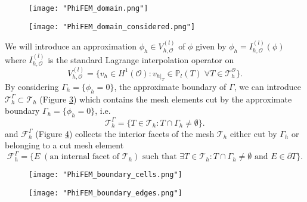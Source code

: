 \begin{minipage}{0.52\linewidth}
	\begin{figure}[H]
		\centering
		\texttt{[image: "PhiFEM\_domain.png"]}
		\label{space2}
	\end{figure}
\end{minipage} \;
\begin{minipage}{0.44\linewidth}
	\begin{figure}[H]
		\centering
		\texttt{[image: "PhiFEM\_domain\_considered.png"]}
		\label{space3}
	\end{figure}
\end{minipage}

We will introduce an approximation $\phi_h\in V_{h,\mathcal{O}}^{(l)}$ of $\phi$ given by $\phi_h=I_{h,\mathcal{O}}^{(l)}(\phi)$ where $I_{h,\mathcal{O}}^{(l)}$ is the standard Lagrange interpolation operator on
\begin{equation*}
	V_{h,\mathcal{O}}^{(l)}=\{v_h\in H^1(\mathcal{O}):v_{h|_T}\in\mathbb{P}_l(T) \;  \forall T\in\mathcal{T}_h^\mathcal{O}\}.
\end{equation*}
By considering $\Gamma_h=\{\phi_h=0\}$, the approximate boundary of $\Gamma$, we can introduce $\mathcal{T}_h^\Gamma\subset \mathcal{T}_h$ (Figure \ref{space4}) which contains the mesh elements cut by the
approximate boundary $\Gamma_h = \{\phi_h=0\}$, i.e. 
\begin{equation*}
	\mathcal{T}_h^\Gamma=\{T\in \mathcal{T}_h:T\cap\Gamma_h\ne\emptyset\}.
\end{equation*}
and $\mathcal{F}_h^\Gamma$ (Figure \ref{space5}) collects the interior facets of the mesh $\mathcal{T}_h$ either cut by $\Gamma_h$ or belonging to a cut mesh element
\begin{equation*}
	\mathcal{F}_h^\Gamma=\{E\;(\text{an internal facet of } \mathcal{T}_h) \text{ such that } \exists T\in \mathcal{T}_h:T\cap\Gamma_h\ne\emptyset \text{ and } E\in\partial T\}.
\end{equation*}

\begin{minipage}{0.48\linewidth}
	\begin{figure}[H]
		\centering
		\texttt{[image: "PhiFEM\_boundary\_cells.png"]}
		\label{space4}
	\end{figure}
\end{minipage} \;
\begin{minipage}{0.48\linewidth}
	\begin{figure}[H]
		\centering
		\texttt{[image: "PhiFEM\_boundary\_edges.png"]}
		\label{space5}
	\end{figure}
\end{minipage}

